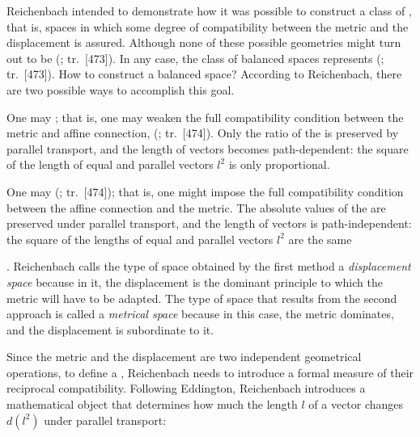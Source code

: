\documentclass[final]{article}
\renewcommand{\rzlap}[2]{(\cite[#1]{Reichenbach1928}; tr.\ [#2])\xspace}
\begin{document}
Reichenbach intended to demonstrate how it was possible to construct a class of , that is, spaces in which some degree of compatibility between the metric and the displacement is assured. Although none of these possible geometries might turn out to be  \rzlap{339}{473}. In any case, the class of balanced spaces represents  \rzlap{339}{473}. How to construct a balanced space? According to Reichenbach, there are two possible ways to accomplish this goal. \begin{inparaenum}[(1)] \item One may ; that is, one may weaken the full compatibility condition between the metric and affine connection,  \rzlap{339}{474}. Only the ratio of the \gmn is preserved by parallel transport, and the length of vectors becomes path-dependent: the square of the length of equal and parallel vectors $l^2$ is only proportional. \item One may  \rzlap{339}{474}; that is, one might impose the full compatibility condition between the affine connection and the metric. The absolute values of the \gmn are preserved under parallel transport, and the length of vectors is path-independent: the square of the lengths of equal and parallel vectors $l^2$ are the same \end{inparaenum}. Reichenbach calls the type of space obtained by the first method a \emph{displacement space} because in it, the displacement is the dominant principle to which the metric will have to be adapted. The type of space that results from the second approach is called a \emph{metrical space} because in this case, the metric dominates, and the displacement is subordinate to it.

Since the metric and the displacement are two independent geometrical operations, to define a , Reichenbach needs to introduce a formal measure of their reciprocal compatibility. Following Eddington, Reichenbach introduces a mathematical object that determines how much the length $l$ of a vector changes $d\left(l^{2}\right)$ under parallel transport:
\end{document}
